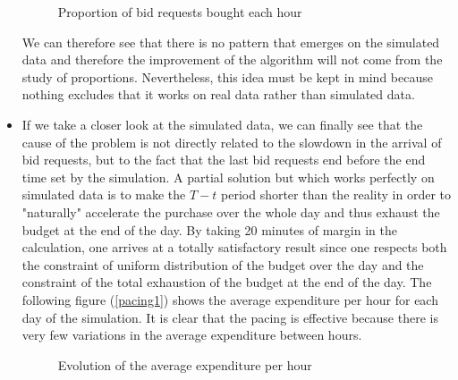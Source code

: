 \documentclass[12pt]{article}
\begin{document}
\begin{itemize}
\begin{figure}[h!]
	\centering
	\caption{Proportion of bid requests bought each hour}
	\label{prop1}
\end{figure}

We can therefore see that there is no pattern that emerges on the simulated data and therefore the improvement of the algorithm will not come from the study of proportions. Nevertheless, this idea must be kept in mind because nothing excludes that it works on real data rather than simulated data. 
\item If we take a closer look at the simulated data, we can finally see that the cause of the problem is not directly related to the slowdown in the arrival of bid requests, but to the fact that the last bid requests end before the end time set by the simulation. A partial solution but which works perfectly on simulated data is to make the $T-t$ period shorter than the reality in order to "naturally" accelerate the purchase over the whole day and thus exhaust the budget at the end of the day. By taking 20 minutes of margin in the calculation, one arrives at a totally satisfactory result since one respects both the constraint of uniform distribution of the budget over the day and the constraint of the total exhaustion of the budget at the end of the day. The following figure (\autoref{pacing1}) shows the average expenditure per hour for each day of the simulation. It is clear that the pacing is effective because there is very few variations in the average expenditure between hours. 

\begin{figure}[h!]
	\centering
	\caption{Evolution of the average expenditure per hour}
	\label{pacing1}
\end{figure}

\end{itemize}

\newpage
\end{document}

